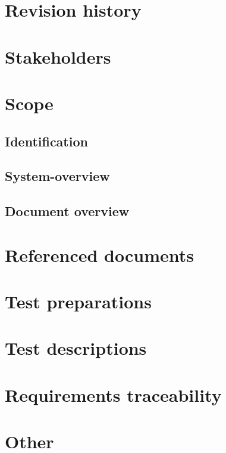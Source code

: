 \documentclass[a4paper, oneside, 11pt]{article}
\begin{document}

\addtolength{\topmargin}{-2cm}
\tableofcontents

\noindent
\newpage
\section{Revision history}

\section{Stakeholders}

\section{Scope}

\subsection{Identification}

\subsection{System-overview}

\subsection{Document overview}

\section{Referenced documents}

\section{Test preparations}

\section{Test descriptions}

\section{Requirements traceability}

\section{Other}

\end{document}
